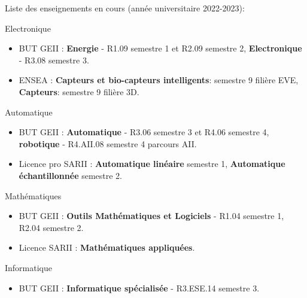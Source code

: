 

Liste des enseignements en cours (année universitaire 2022-2023):
\begin{cvskills}
  \cvskill
    {Electronique} %
    {\begin{itemize}
    	\item BUT GEII : \textbf{Energie} - R1.09 semestre 1 et R2.09 semestre 2, \textbf{Electronique} - R3.08 semestre 3.
    	\item ENSEA : \textbf{Capteurs et bio-capteurs intelligents}: semestre 9 filière EVE, \textbf{Capteurs}: semestre 9 filière 3D.
    \end{itemize}
    } %
  \cvskill
    {Automatique} %
    {\begin{itemize}
    	\item BUT GEII : \textbf{Automatique} - R3.06 semestre 3 et R4.06 semestre 4, \textbf{robotique} - R4.AII.08 semestre 4 parcours AII.
    	\item Licence pro SARII : \textbf{Automatique linéaire} semestre 1, \textbf{Automatique échantillonnée} semestre 2.
    \end{itemize}
    } %
  \cvskill
    {Mathématiques} %
    {\begin{itemize}
    	\item BUT GEII : \textbf{Outils Mathématiques et Logiciels} - R1.04 semestre 1, R2.04 semestre 2.
    	\item Licence SARII : \textbf{Mathématiques appliquées}.
    \end{itemize}
    } %
  \cvskill
    {Informatique} %
    {\begin{itemize}
    	\item BUT GEII : \textbf{Informatique spécialisée} - R3.ESE.14 semestre 3.
    \end{itemize}
    } %
\end{cvskills}

